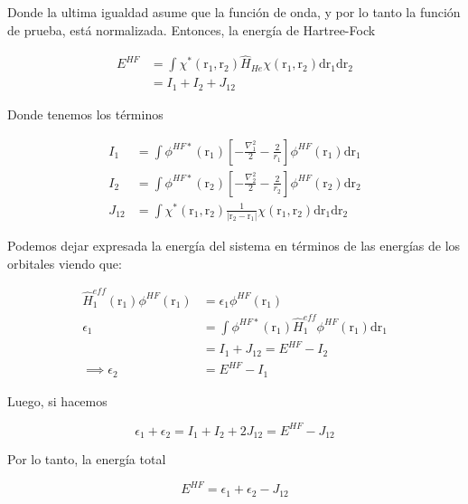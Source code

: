 \documentclass[aps,twocolumn,preprintnumbers]{revtex4}
\begin{document}
  Donde la ultima igualdad asume que la función de onda, y por lo tanto la función de prueba, está normalizada. Entonces, la energía de Hartree-Fock

  \begin{align}
    E^{HF} &= \int\chi^*(\bm{\mathrm{r}}_1,\bm{\mathrm{r}}_2)\hat{H}_{He}\chi(\bm{\mathrm{r}}_1,\bm{\mathrm{r}}_2)\mathrm{d}\bm{\mathrm{r}}_1\mathrm{d}\bm{\mathrm{r}}_2\\
    &= I_1 + I_2 + J_{12}
  \end{align}

  Donde tenemos los términos

  \begin{align}
    I_1 &= \int\phi^{HF*}(\bm{\mathrm{r}}_1)\left[-\frac{\nabla_1^2}{2} -\frac{2}{r_1}\right]\phi^{HF}(\bm{\mathrm{r}}_1)\mathrm{d}\bm{\mathrm{r}}_1\\
    I_2 &= \int\phi^{HF*}(\bm{\mathrm{r}}_2)\left[-\frac{\nabla_2^2}{2} -\frac{2}{r_2}\right]\phi^{HF}(\bm{\mathrm{r}}_2)\mathrm{d}\bm{\mathrm{r}}_2\\
    J_{12} &= \int\chi^*(\bm{\mathrm{r}}_1,\bm{\mathrm{r}}_2)\frac{1}{|\bm{\mathrm{r}}_2-\bm{\mathrm{r}}_1|}\chi(\bm{\mathrm{r}}_1,\bm{\mathrm{r}}_2)\mathrm{d}\bm{\mathrm{r}}_1\mathrm{d}\bm{\mathrm{r}}_2
  \end{align}

  Podemos dejar expresada la energía del sistema en términos de las energías de los orbitales viendo que:

  \begin{align}
    \hat{H}_1^{eff}(\bm{\mathrm{r}}_1)\phi^{HF}(\bm{\mathrm{r}}_1) &= \epsilon_1\phi^{HF}(\bm{\mathrm{r}}_1)\\
    \epsilon_1 &= \int\phi^{HF*}(\bm{\mathrm{r}}_1)\hat{H}_1^{eff}\phi^{HF}(\bm{\mathrm{r}}_1)\mathrm{d}\bm{\mathrm{r}}_1\\
    &= I_1 + J_{12} = E^{HF} - I_2 \\
    \implies \epsilon_2 &= E^{HF} - I_1
  \end{align}

  Luego, si hacemos

  \begin{equation}
    \epsilon_1 + \epsilon_2 = I_1 + I_2 + 2J_{12} = E^{HF} - J_{12}
  \end{equation}

  Por lo tanto, la energía total

  \begin{equation}
    E^{HF} = \epsilon_1 + \epsilon_2 - J_{12}
  \end{equation}
\end{document}
